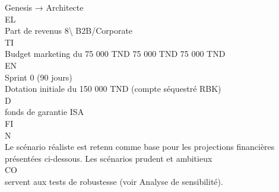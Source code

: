 Genesis → Architecte\\
\vspace{0.5em}
\vspace{0.5em}
\vspace{0.5em}
\vspace{0.5em}
EL\\
Part de revenus              8\textbackslash{}%
B2B/Corporate\\
\vspace{0.5em}
\vspace{0.5em}
\vspace{0.5em}
\vspace{0.5em}
TI\\
Budget marketing du      75 000 TND 75 000 TND 75 000 TND\\
\vspace{0.5em}
\vspace{0.5em}
\vspace{0.5em}
\vspace{0.5em}
EN\\
Sprint 0 (90 jours)\\
Dotation initiale du     150 000 TND (compte séquestré RBK)\\
\vspace{0.5em}
\vspace{0.5em}
\vspace{0.5em}
\vspace{0.5em}
D\\
fonds de garantie ISA\\
\vspace{0.5em}
\vspace{0.5em}
\vspace{0.5em}
\vspace{0.5em}
FI\\
N\\
Le scénario réaliste est retenu comme base pour les projections financières présentées ci-dessous. Les scénarios prudent et ambitieux\\
CO\\
servent aux tests de robustesse (voir Analyse de sensibilité).\\
\vspace{0.5em}
\vspace{0.5em}
